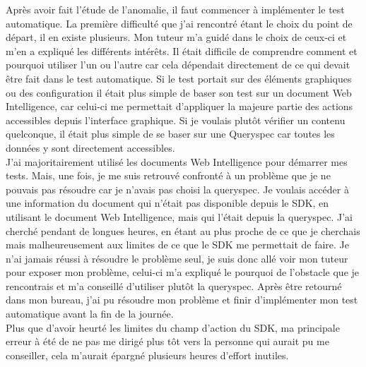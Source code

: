 Apr\`{e}s avoir fait l'\'{e}tude de l'anomalie, il faut commencer \`{a} impl\'{e}menter le test automatique. La premi\`{e}re difficult\'{e} que j'ai rencontr\'{e} \'{e}tant le choix du point de d\'{e}part, il en existe plusieurs. Mon tuteur m'a guid\'{e} dans le choix de ceux-ci et m'en a expliqu\'{e} les diff\'{e}rents int\'{e}r\^{e}ts. Il \'{e}tait difficile de comprendre comment et pourquoi utiliser l'un ou l'autre car cela d\'{e}pendait directement de ce qui devait \^{e}tre fait dans le test automatique. Si le test portait sur des \'{e}l\'{e}ments graphiques ou des configuration il \'{e}tait plus simple de baser son test sur un document Web Intelligence, car celui-ci me permettait d'appliquer la majeure partie des actions accessibles depuis l'interface graphique. Si je voulais plut\^{o}t v\'{e}rifier un contenu quelconque, il \'{e}tait plus simple de se baser sur une \gls{Queryspec} car toutes les donn\'{e}es y sont directement accessibles. \\
J'ai majoritairement utilis\'{e} les documents Web Intelligence pour d\'{e}marrer mes tests. Mais, une fois, je me suis retrouv\'{e} confront\'{e} \`{a} un probl\`{e}me que je ne pouvais pas r\'{e}soudre car je n'avais pas choisi la queryspec. Je voulais acc\'{e}der \`{a} une information du document qui n'\'{e}tait pas disponible depuis le \gls{SDK}, en utilisant le document Web Intelligence, mais qui l'\'{e}tait depuis la queryspec. J'ai cherch\'{e} pendant de longues heures, en \'{e}tant au plus proche de ce que je cherchais mais malheureusement aux limites de ce que le \gls{SDK} me permettait de faire. Je n'ai jamais r\'{e}ussi \`{a} r\'{e}soudre le probl\`{e}me seul, je suis donc all\'{e} voir mon tuteur pour exposer mon probl\`{e}me, celui-ci m'a expliqu\'{e} le pourquoi de l'obstacle que je rencontrais et m'a conseill\'{e} d'utiliser plut\^{o}t la queryspec. Apr\`{e}s \^{e}tre retourn\'{e} dans mon bureau, j'ai pu r\'{e}soudre mon probl\`{e}me et finir d'impl\'{e}menter mon test automatique avant la fin de la journ\'{e}e.\\
Plus que d'avoir heurt\'{e} les limites du champ d'action du \gls{SDK}, ma principale erreur \`{a} \'{e}t\'{e} de ne pas me dirig\'{e} plus t\^{o}t vers la personne qui aurait pu me conseiller, cela m'aurait \'{e}pargn\'{e} plusieurs heures d'effort inutiles.\\

